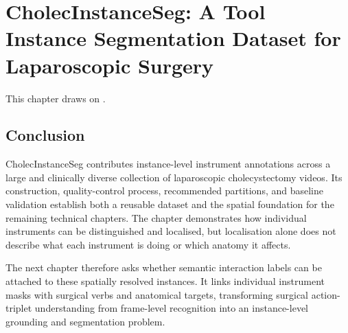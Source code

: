 \chapter{CholecInstanceSeg: A Tool Instance Segmentation Dataset for Laparoscopic Surgery}
\label{chap:cholecinstanceseg}
\minitoc

This chapter draws on .

\begingroup
\setlength{\emergencystretch}{2em}
\graphicspath{{phd_papers/sources/Scientific_data_cholecInstance_seg/}}
\providecommand{\revref}[2]{\ignorespaces}
\providecommand{\robustrevref}[2]{\ignorespaces}
\providecommand{\revmod}[1]{#1}
\providecommand{\revnew}[1]{#1}
\providecommand{\revdel}[1]{\ignorespaces}
\providecommand{\greencheck}{{\color{green}\checkmark}}
\providecommand{\figref}[1]{\figurename~\ref{#1}}
\providecommand{\tabref}[1]{\tablename~\ref{#1}}
\providecommand{\secref}[1]{Section~\ref{#1}}
\providecommand{\chaptref}[1]{Chapter~\ref{#1}}








\section{Conclusion}

CholecInstanceSeg contributes instance-level instrument annotations across a large and clinically diverse collection of laparoscopic cholecystectomy videos. Its construction, quality-control process, recommended partitions, and baseline validation establish both a reusable dataset and the spatial foundation for the remaining technical chapters. The chapter demonstrates how individual instruments can be distinguished and localised, but localisation alone does not describe what each instrument is doing or which anatomy it affects.

The next chapter therefore asks whether semantic interaction labels can be attached to these spatially resolved instances. It links individual instrument masks with surgical verbs and anatomical targets, transforming surgical action-triplet understanding from frame-level recognition into an instance-level grounding and segmentation problem.
\endgroup

